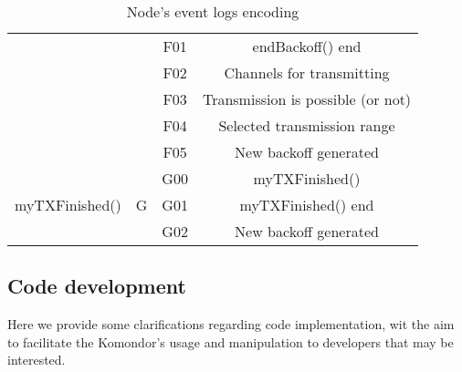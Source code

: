 \documentclass[a4paper]{article}
\begin{document}
\begin{table}[h!]
\begin{tabular}{|c|c|c|c|}
		                                           &                     & F01               & endBackoff() end                                        \\ \cline{3-4} 
		                                           &                     & F02               & Channels for transmitting                               \\ \cline{3-4} 
		                                           &                     & F03               & Transmission is possible (or not)                       \\ \cline{3-4} 
		                                           &                     & F04               & Selected transmission range                             \\ \cline{3-4} 
		                                           &                     & F05               & New backoff generated                                   \\ \hline
		\multirow{3}{*}{myTXFinished()}            & \multirow{3}{*}{G}  & G00               & myTXFinished()                                          \\ \cline{3-4} 
		                                           &                     & G01               & myTXFinished() end                                      \\ \cline{3-4} 
		                                           &                     & G02               & New backoff generated                                   \\ \hline
		\end{tabular}
		\caption{Node's event logs encoding}
		\label{table:event_coding}
		\end{table}

	\subsection{Code development}
	\label{section:code_development}		
	Here we provide some clarifications regarding code implementation, wit the aim to facilitate the Komondor's usage and manipulation to developers that may be interested.
	
\end{document}
